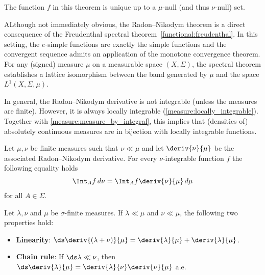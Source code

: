     \begin{remark}
        The function $f$ in this theorem is unique up to a $\mu$-null (and thus $\nu$-null) set.
    \end{remark}

    \begin{remark}[Freudenthal]
        ALthough not immediately obvious, the Radon--Nikodym theorem is a direct consequence of the Freudenthal spectral theorem~\ref{functional:freudenthal}. In this setting, the $e$-simple functions are exactly the simple functions and the convergent sequence admits an application of the monotone convergence theorem. For any (signed) measure $\mu$ on a measurable space $(X,\Sigma)$, the spectral theorem establishes a lattice isomorphism between the band generated by $\mu$ and the space $L^1(X,\Sigma,\mu)$.
    \end{remark}

    \begin{property}[Integrability]
        In general, the Radon--Nikodym derivative is not integrable (unless the measures are finite). However, it is always locally integrable (\cref{measure:locally_integrable}). Together with \cref{measure:measure_by_integral}, this implies that (densities of) absolutely continuous measures are in bijection with locally integrable functions.
    \end{property}

    \begin{property}
        Let $\mu,\nu$ be finite measures such that $\nu\ll\mu$ and let $\deriv{\nu}{\mu}$ be the associated Radon--Nikodym derivative. For every $\nu$-integrable function $f$ the following equality holds
        \begin{gather}
            \Int_A f\,d\nu = \Int_Af\deriv{\nu}{\mu}\,d\mu
        \end{gather}
        for all $A\in\Sigma$.
    \end{property}

    \begin{property}
        Let $\lambda,\nu$ and $\mu$ be $\sigma$-finite measures. If $\lambda\ll\mu$ and $\nu\ll\mu$, the following two properties hold:
        \begin{itemize}
            \item\textbf{Linearity}: $\ds\deriv{(\lambda+\nu)}{\mu} = \deriv{\lambda}{\mu} + \deriv{\lambda}{\mu}$.
            \item\textbf{Chain rule}: If $\ds\lambda\ll\nu$, then $\ds\deriv{\lambda}{\mu} = \deriv{\lambda}{\nu}\deriv{\nu}{\mu}$ a.e.
        \end{itemize}
    \end{property}

